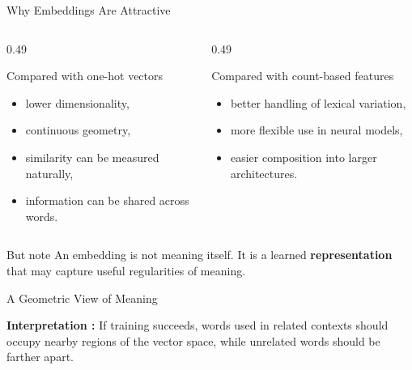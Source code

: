 \documentclass[11pt,aspectratio=169,professionalfonts]{beamer}
\begin{document}
\begin{frame}{Why Embeddings Are Attractive}
\begin{columns}[T]
\begin{column}{0.49\textwidth}
\begin{block}{Compared with one-hot vectors}
\begin{itemize}
    \item lower dimensionality,
    \item continuous geometry,
    \item similarity can be measured naturally,
    \item information can be shared across words.
\end{itemize}
\end{block}
\end{column}
\begin{column}{0.49\textwidth}
\begin{block}{Compared with count-based features}
\begin{itemize}
    \item better handling of lexical variation,
    \item more flexible use in neural models,
    \item easier composition into larger architectures.
\end{itemize}
\end{block}
\end{column}
\end{columns}

\vspace{0.2cm}
\begin{alertblock}{But note}
An embedding is not meaning itself. It is a learned \textbf{representation} that may capture useful regularities of meaning.
\end{alertblock}
\end{frame}
%
%
\begin{frame}{A Geometric View of Meaning}
\begin{center}
\end{center}

\small
\textbf{Interpretation : } If training succeeds, words used in related contexts should occupy nearby regions of the vector space, while unrelated words should be farther apart.
\end{frame}
\end{document}
